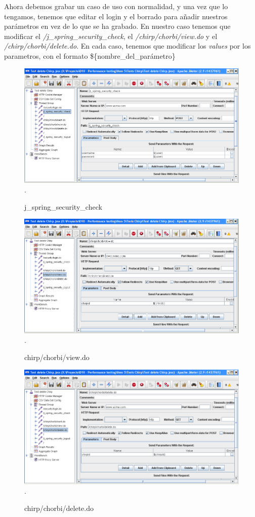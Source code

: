 \documentclass[a4paper]{article}
\begin{document}
Ahora debemos grabar un caso de uso con normalidad, y una vez que lo tengamos, tenemos que editar el login y el borrado para añadir nuestros parámetros en vez de lo que se ha grabado. En nuestro caso tenemos que modificar el \textit{/j\_spring\_security\_check}, el \textit{/chirp/chorbi/view.do} y el \textit{/chirp/chorbi/delete.do}. En cada caso, tenemos que modificar los \textit{values} por los parametros, con el formato \$\{nombre\_del\_parámetro\}

\begin{figure}[h!]
\includegraphics[width=\linewidth]{Config2}.
  \caption{j\_spring\_security\_check}
\end{figure}

\begin{figure}[h!]
\includegraphics[width=\linewidth]{Config3}.
  \caption{chirp/chorbi/view.do}
\end{figure}

\begin{figure}[h!]
\includegraphics[width=\linewidth]{Config4}.
  \caption{chirp/chorbi/delete.do}
\end{figure}
\end{document}
